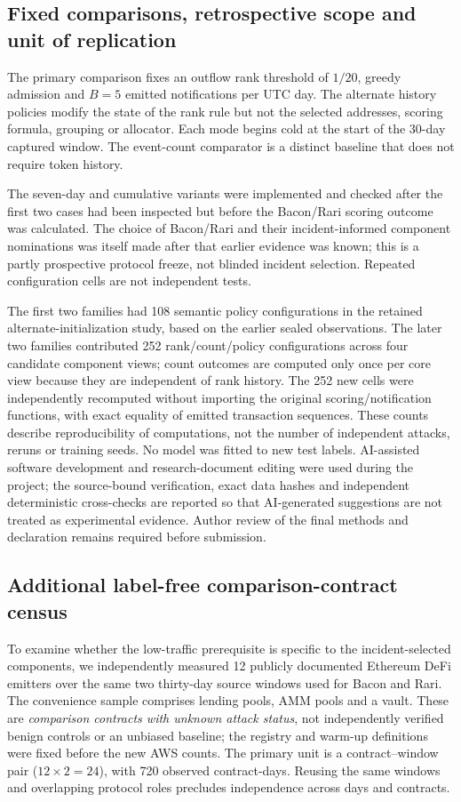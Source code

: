 \documentclass[preprint,12pt,authoryear]{elsarticle}
\begin{document}
\subsection{Fixed comparisons, retrospective scope and unit of replication}
The primary comparison fixes an outflow rank threshold of $1/20$, greedy admission and $B=5$ emitted notifications per UTC day. The alternate history policies modify the state of the rank rule but not the selected addresses, scoring formula, grouping or allocator. Each mode begins cold at the start of the 30-day captured window. The event-count comparator is a distinct baseline that does not require token history.

The seven-day and cumulative variants were implemented and checked after the first two cases had been inspected but before the Bacon/Rari scoring outcome was calculated. The choice of Bacon/Rari and their incident-informed component nominations was itself made after that earlier evidence was known; this is a partly prospective protocol freeze, not blinded incident selection. Repeated configuration cells are not independent tests.

The first two families had 108 semantic policy configurations in the retained alternate-initialization study, based on the earlier sealed observations. The later two families contributed 252 rank/count/policy configurations across four candidate component views; count outcomes are computed only once per core view because they are independent of rank history. The 252 new cells were independently recomputed without importing the original scoring/notification functions, with exact equality of emitted transaction sequences. These counts describe reproducibility of computations, not the number of independent attacks, reruns or training seeds. No model was fitted to new test labels. AI-assisted software development and research-document editing were used during the project; the source-bound verification, exact data hashes and independent deterministic cross-checks are reported so that AI-generated suggestions are not treated as experimental evidence. Author review of the final methods and declaration remains required before submission.

\subsection{Additional label-free comparison-contract census}
To examine whether the low-traffic prerequisite is specific to the incident-selected components, we independently measured 12 publicly documented Ethereum DeFi emitters over the same two thirty-day source windows used for Bacon and Rari. The convenience sample comprises lending pools, AMM pools and a vault. These are \emph{comparison contracts with unknown attack status}, not independently verified benign controls or an unbiased baseline; the registry and warm-up definitions were fixed before the new AWS counts. The primary unit is a contract--window pair ($12\times2=24$), with 720 observed contract-days. Reusing the same windows and overlapping protocol roles precludes independence across days and contracts.
\end{document}
